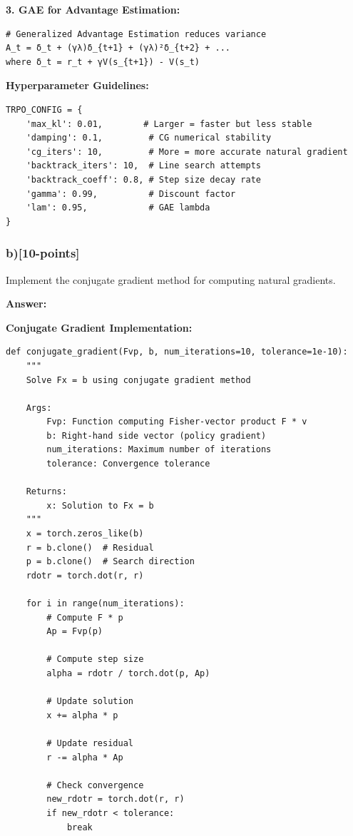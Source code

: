 \documentclass[12pt]{article}
\begin{document}
{{\textbf{3. GAE for Advantage Estimation:}
\begin{verbatim}
# Generalized Advantage Estimation reduces variance
A_t = δ_t + (γλ)δ_{t+1} + (γλ)²δ_{t+2} + ...
where δ_t = r_t + γV(s_{t+1}) - V(s_t)
\end{verbatim}

\textbf{Hyperparameter Guidelines:}
\begin{verbatim}
TRPO_CONFIG = {
    'max_kl': 0.01,        # Larger = faster but less stable
    'damping': 0.1,         # CG numerical stability
    'cg_iters': 10,         # More = more accurate natural gradient
    'backtrack_iters': 10,  # Line search attempts
    'backtrack_coeff': 0.8, # Step size decay rate
    'gamma': 0.99,          # Discount factor
    'lam': 0.95,            # GAE lambda
}
\end{verbatim}

\subsubsection{b)[10-points]} Implement the conjugate gradient method for computing natural gradients.

\textbf{Answer:}

\textbf{Conjugate Gradient Implementation:}

\begin{verbatim}
def conjugate_gradient(Fvp, b, num_iterations=10, tolerance=1e-10):
    """
    Solve Fx = b using conjugate gradient method
    
    Args:
        Fvp: Function computing Fisher-vector product F * v
        b: Right-hand side vector (policy gradient)
        num_iterations: Maximum number of iterations
        tolerance: Convergence tolerance
    
    Returns:
        x: Solution to Fx = b
    """
    x = torch.zeros_like(b)
    r = b.clone()  # Residual
    p = b.clone()  # Search direction
    rdotr = torch.dot(r, r)
    
    for i in range(num_iterations):
        # Compute F * p
        Ap = Fvp(p)
        
        # Compute step size
        alpha = rdotr / torch.dot(p, Ap)
        
        # Update solution
        x += alpha * p
        
        # Update residual
        r -= alpha * Ap
        
        # Check convergence
        new_rdotr = torch.dot(r, r)
        if new_rdotr < tolerance:
            break
        

\end{verbatim}}}
\end{document}
